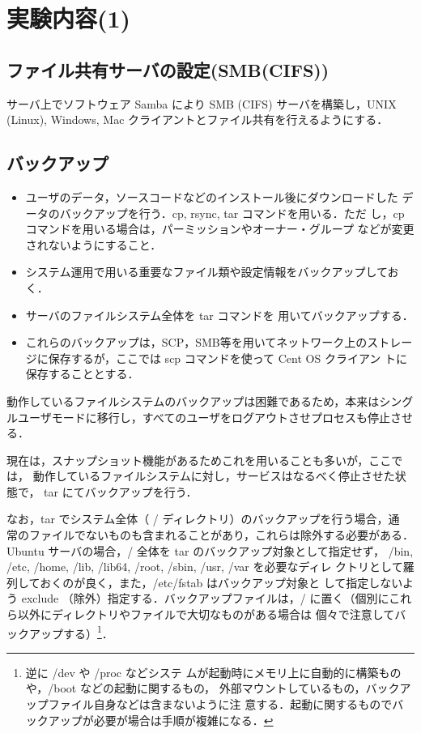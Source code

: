 \section{実験内容(1)}

\subsection*{ファイル共有サーバの設定(SMB(CIFS))}

サーバ上でソフトウェア Samba により SMB (CIFS) サーバを構築し，UNIX
(Linux), Windows, Mac クライアントとファイル共有を行えるようにする．

\subsection*{バックアップ}

\begin{itemize}
 \item ユーザのデータ，ソースコードなどのインストール後にダウンロードした
       データのバックアップを行う．cp, rsync, tar コマンドを用いる．ただ
       し，cp コマンドを用いる場合は，パーミッションやオーナー・グループ
       などが変更されないようにすること．
 \item システム運用で用いる重要なファイル類や設定情報をバックアップしてお
       く．
 \item サーバのファイルシステム全体を tar コマンドを
       用いてバックアップする．
 \item これらのバックアップは，SCP，SMB等を用いてネットワーク上のストレー
       ジに保存するが，ここでは scp コマンドを使って Cent OS クライアン
       トに保存することとする．
\end{itemize}

動作しているファイルシステムのバックアップは困難であるため，本来はシング
ルユーザモードに移行し，すべてのユーザをログアウトさせプロセスも停止させ
る．

現在は，スナップショット機能があるためこれを用いることも多いが，ここでは，
動作しているファイルシステムに対し，サービスはなるべく停止させた状態で，
tar にてバックアップを行う．

なお，tar でシステム全体（ / ディレクトリ）のバックアップを行う場合，通
常のファイルでないものも含まれることがあり，これらは除外する必要がある．
Ubuntu サーバの場合，/ 全体を tar のバックアップ対象として指定せず，
/bin, /etc, /home, /lib, /lib64, /root, /sbin, /usr, /var を必要なディレ
クトリとして羅列しておくのが良く，また，/etc/fstab はバックアップ対象と
して指定しないよう exclude （除外）指定する．バックアップファイルは，/ 
に置く（個別にこれら以外にディレクトリやファイルで大切なものがある場合は
個々で注意してバックアップする）\footnote{逆に /dev や /proc などシステ
ムが起動時にメモリ上に自動的に構築ものや，/boot などの起動に関するもの，
外部マウントしているもの，バックアップファイル自身などは含まないように注
意する．起動に関するものでバックアップが必要が場合は手順が複雑になる．}．

